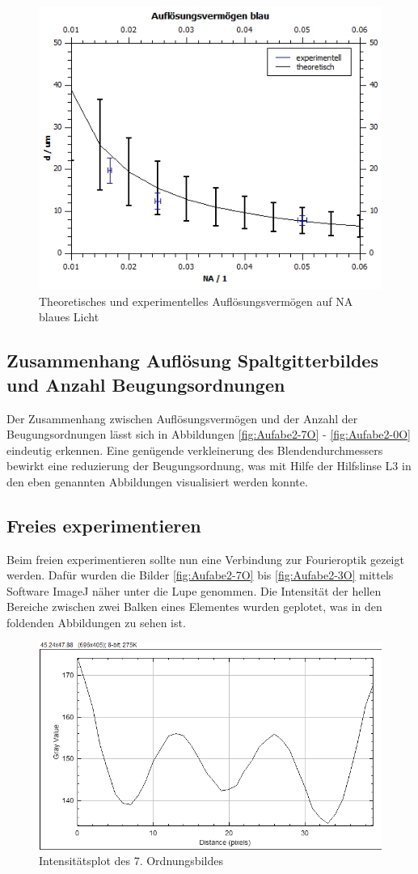 \documentclass[12pt,a4paper,twoside]{article}
\begin{document}
\begin{figure}[H]
    \centering
    \includegraphics[width=0.6\linewidth]{nudes/AuflösungsvermögenPlotBlau.jpg}
    \caption{Theoretisches und experimentelles Auflösungsvermögen auf NA blaues Licht}
    \label{fig:AuflösungsvermögenPlotBlau}
\end{figure}


\subsection{Zusammenhang Auflösung Spaltgitterbildes und Anzahl Beugungsordnungen}

Der Zusammenhang zwischen Auflösungsvermögen und der Anzahl der Beugungsordnungen lässt sich in Abbildungen \ref{fig:Aufabe2-7O} - \ref{fig:Aufabe2-0O} eindeutig erkennen.
Eine genügende verkleinerung des Blendendurchmessers bewirkt eine reduzierung der Beugungsordnung, was mit Hilfe der Hilfslinse L3 in den eben genannten Abbildungen visualisiert werden konnte.


\subsection{Freies experimentieren}

Beim freien experimentieren sollte nun eine Verbindung zur Fourieroptik gezeigt werden.
Dafür wurden die Bilder \ref{fig:Aufabe2-7O} bis \ref{fig:Aufabe2-3O} mittels Software ImageJ näher unter die Lupe genommen.
Die Intensität der hellen Bereiche zwischen zwei Balken eines Elementes wurden geplotet, was in den foldenden Abbildungen zu sehen ist.

\begin{figure}[H]
    \centering
    \includegraphics[width=0.6\linewidth]{nudes/A3_O7_Plot.png}
    \caption{Intensitätsplot des 7. Ordnungsbildes}
    \label{fig:IntensitätsPlotO7}
\end{figure}
\end{document}

